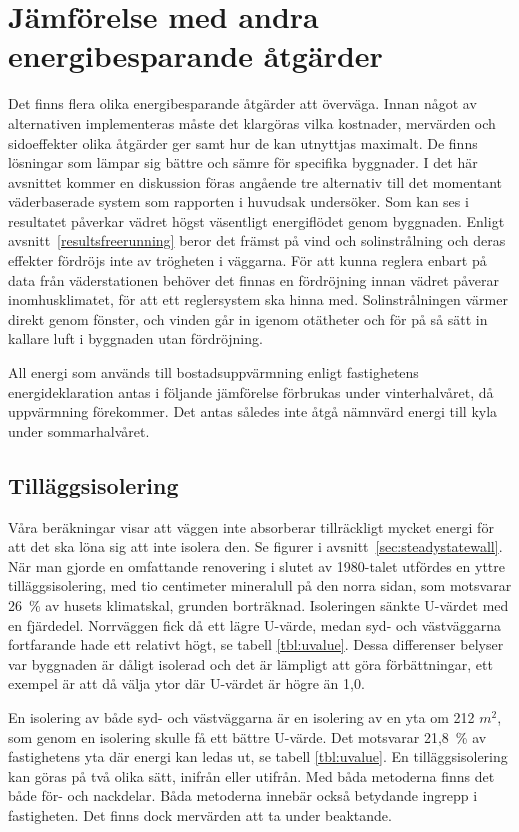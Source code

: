 \section{Jämförelse med andra energibesparande åtgärder}

Det finns flera olika energibesparande åtgärder att överväga. Innan något av alternativen implementeras måste det klargöras vilka kostnader, mervärden och sidoeffekter olika åtgärder ger samt hur de kan utnyttjas maximalt. De finns lösningar som lämpar sig bättre och sämre för specifika byggnader. I det här avsnittet kommer en diskussion föras angående tre alternativ till det momentant väderbaserade system som rapporten i huvudsak undersöker. 
Som kan ses i resultatet påverkar vädret högst väsentligt energiflödet genom byggnaden. Enligt avsnitt~\ref{resultsfreerunning} beror det främst på vind och solinstrålning och deras effekter fördröjs inte av trögheten i väggarna. För att kunna reglera enbart på data från väderstationen behöver det finnas en fördröjning innan vädret påverar inomhusklimatet, för att ett reglersystem ska hinna med. Solinstrålningen värmer direkt genom fönster, och vinden går in igenom otätheter och för på så sätt in kallare luft i byggnaden utan fördröjning.

All energi som används till bostadsuppvärmning enligt fastighetens energideklaration\cite{energideklaration} antas i följande jämförelse förbrukas under vinterhalvåret, då uppvärmning förekommer. Det antas således inte åtgå nämnvärd energi till kyla under sommarhalvåret.

\subsection{Tilläggsisolering}
Våra beräkningar visar att väggen inte absorberar tillräckligt mycket energi för att det ska löna sig att inte isolera den. Se figurer i avsnitt~\ref{sec:steadystatewall}.
När man gjorde en omfattande renovering i slutet av 1980-talet utfördes en yttre tilläggsisolering, med tio centimeter mineralull på den norra sidan\cite{arsredovisning}, som motsvarar 26~\% av husets klimatskal, grunden borträknad. Isoleringen sänkte U-värdet med en fjärdedel. Norrväggen fick då ett lägre U-värde, medan syd- och västväggarna fortfarande hade ett relativt högt, se tabell \ref{tbl:uvalue}.
Dessa differenser belyser var byggnaden är dåligt isolerad och det är lämpligt att göra förbättningar, ett exempel är att då välja ytor där U-värdet är högre än 1,0.

En isolering av både syd- och västväggarna är en isolering av en yta om 212 $\unit{m^2}$, som genom en isolering skulle få ett bättre U-värde. Det motsvarar 21,8~\% av fastighetens yta där energi kan ledas ut, se tabell \ref{tbl:uvalue}.
En tilläggsisolering kan göras på två olika sätt, inifrån eller utifrån. Med båda metoderna finns det både för- och nackdelar. Båda metoderna innebär också betydande ingrepp i fastigheten. Det finns dock mervärden att ta under beaktande. 

